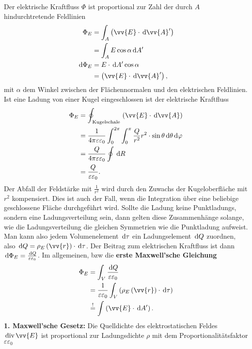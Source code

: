 Der elektrische Kraftfluss $\Phi $ ist proportional zur Zahl der durch $A$ hindurchtretende Feldlinien
\begin{align*}
        \Phi _E&=\int_{A}^{}\left(\vv{E}\cdot \td \vv{A}'\right)\\
               &=\int_{A}^{}E\cos \alpha \td A'\\
        \td \Phi _E&=E\cdot \td A'\cos \alpha \\
                   &=\left(\vv{E}\cdot \td \vv{A}'\right)
,\end{align*}
mit $\alpha $ dem Winkel zwischen der Flächennormalen und den elektrischen Feldlinien. Ist eine Ladung von einer Kugel eingeschlossen ist der elektrische Kraftfluss
\begin{align*}
        \Phi _E&=\oint_{\,\text{Kugelschale}\,}^{}\left(\vv{E}\cdot \td \vv{A}\right)\\
               &=\dfrac{1}{4\pi \varepsilon \varepsilon _0}\int_{0}^{2\pi }\int_{0}^{\pi }\dfrac{Q}{r^2}r^2\cdot \sin \theta \td \theta \td \varphi \\
               &=\dfrac{Q}{4\pi \varepsilon \varepsilon _0}\oint_{}^{}\td R\\
               &=\dfrac{Q}{\varepsilon \varepsilon _0}
.\end{align*}
Der Abfall der Feldstärke mit $\tfrac{1}{r^2}$ wird durch den Zuwachs der Kugeloberfläche mit $r^2$ kompensiert. Dies ist auch der Fall, wenn die Integration über eine beliebige geschlossene Fläche durchgeführt wird. Sollte die Ladung keine Punktladungs, sondern eine Ladungsverteilung sein, dann gelten diese Zusammenhänge solange, wie die Ladungsverteilung die gleichen Symmetrien wie die Punktladung aufweist. Man kann also jedem Volumenelement $\,\text{d} \tau $ ein Ladungselement $\,\text{d} Q$ zuordnen, also $\td Q=\rho _E\left(\vv{r}\right)\cdot \td \tau $. Der Beitrag zum elektrischen Kraftfluss ist dann $\,\text{d} \Phi _E=\tfrac{\,\text{d} Q}{\varepsilon \varepsilon _0}$. Im allgemeinen, bzw die \textbf{erste Maxwell'sche Gleichung}
\begin{align*}
        \Phi _E&=\int_{V}^{}\dfrac{\td Q}{\varepsilon \varepsilon _0}\\
               &=\dfrac{1}{\varepsilon \varepsilon _0}\int_{V}^{}\left(\rho _E\left(\vv{r}\right)\cdot \td \tau \right)\\
               &\stackrel{!}{=}\int_{}^{}\left(\vv{E}\cdot \td A'\right)
.\end{align*}
\textbf{1. Maxwell'sche Gesetz:} Die Quelldichte des elektrostatischen Feldes $\,\text{div}\,\vv{E}$ ist proportional zur Ladungsdichte $\rho $ mit dem Proportionalitätsfaktor $\varepsilon \varepsilon _0$ 
